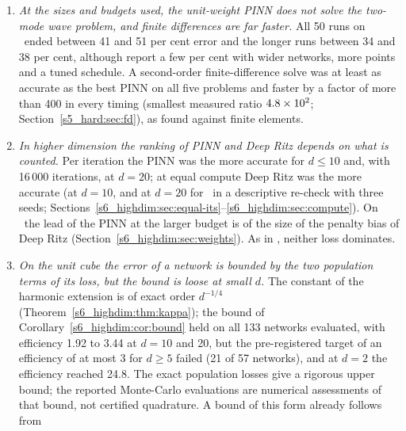 \begin{enumerate}[label=(\arabic*),leftmargin=*]
\item \emph{At the sizes and budgets used, the unit-weight PINN does not solve the two-mode wave
problem, and finite differences are far faster.} All 50 runs on \PWone\ ended between 41 and 51 per
cent error and the longer runs between 34 and 38 per cent, although \citet{rathore2024} report a few
per cent with wider networks, more points and a tuned schedule. A second-order finite-difference solve
was at least as accurate as the best PINN on all five problems and faster by a factor of more than
400 in every timing (smallest measured ratio $4.8\times 10^{2}$; Section~\ref{s5_hard:sec:fd}), as \citet{grossmann2024} found against finite
elements.
\item \emph{In higher dimension the ranking of PINN and Deep Ritz depends on what is counted.} Per
iteration the PINN was the more accurate for $d\le10$ and, with 16\,000 iterations, at $d=20$; at
equal compute Deep Ritz was the more accurate (at $d=10$, and at $d=20$ for \Pone\ in a descriptive
re-check with three seeds; Sections~\ref{s6_highdim:sec:equal-its}--\ref{s6_highdim:sec:compute}).
On \Pone\ the lead of the PINN at the larger budget is of the size of the penalty bias of Deep Ritz
(Section~\ref{s6_highdim:sec:weights}). As in \citet{chen2020comparison}, neither loss dominates.
\item \emph{On the unit cube the error of a network is bounded by the two population terms of its
loss, but the bound is loose at small $d$.} The constant of the harmonic extension is of exact order $d^{-1/4}$
(Theorem~\ref{s6_highdim:thm:kappa}); the bound of Corollary~\ref{s6_highdim:cor:bound} held on all
133 networks evaluated, with efficiency 1.92 to 3.44 at $d=10$ and 20, but the pre-registered target
of an efficiency of at most 3 for $d\ge5$ failed (21 of 57 networks), and at $d=2$ the efficiency
reached 24.8. The exact population losses give a rigorous upper bound; the reported Monte-Carlo
evaluations are numerical assessments of that bound, not certified quadrature. A bound of this form already follows from

\end{enumerate}
